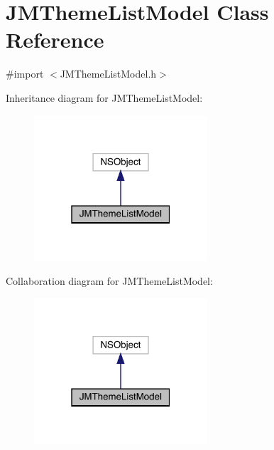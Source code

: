 \hypertarget{interface_j_m_theme_list_model}{}\section{J\+M\+Theme\+List\+Model Class Reference}
\label{interface_j_m_theme_list_model}


{\ttfamily \#import $<$J\+M\+Theme\+List\+Model.\+h$>$}



Inheritance diagram for J\+M\+Theme\+List\+Model\+:\nopagebreak
\begin{figure}[H]
\begin{center}
\leavevmode
\includegraphics[width=183pt]{interface_j_m_theme_list_model__inherit__graph}
\end{center}
\end{figure}


Collaboration diagram for J\+M\+Theme\+List\+Model\+:\nopagebreak
\begin{figure}[H]
\begin{center}
\leavevmode
\includegraphics[width=183pt]{interface_j_m_theme_list_model__coll__graph}
\end{center}
\end{figure}

